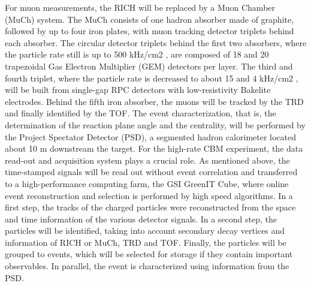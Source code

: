 For muon measurements, the RICH will be replaced by a Muon Chamber (MuCh) system. The MuCh
consists of one hadron absorber made of graphite, followed by up to four iron plates, with muon tracking
detector triplets behind each absorber. The circular detector triplets behind the first two absorbers,
where the particle rate still is up to 500 kHz/cm2
, are composed of 18 and 20 trapezoidal Gas Electron
Multiplier (GEM) detectors per layer. The third and fourth triplet, where the particle rate is decreased
to about 15 and 4 kHz/cm2
, will be built from single-gap RPC detectors with low-resistivity Bakelite
electrodes. Behind the fifth iron absorber, the muons will be tracked by the TRD and finally identified by
the TOF. The event characterization, that is, the determination of the reaction plane angle and the centrality,
will be performed by the Project Spectator Detector (PSD), a segmented hadron calorimeter located about
10 m downstream the target.
For the high-rate CBM experiment, the data read-out and acquisition system plays a crucial role.
As mentioned above, the time-stamped signals will be read out without event correlation and transferred
to a high-performance computing farm, the GSI GreenIT Cube, where online event reconstruction and
selection is performed by high speed algorithms. In a first step, the tracks of the charged particles were
reconstructed from the space and time information of the various detector signals. In a second step,
the particles will be identified, taking into account secondary decay vertices and information of RICH
or MuCh, TRD and TOF. Finally, the particles will be grouped to events, which will be selected for storage if
they contain important observables. In parallel, the event is characterized using information from the PSD.




